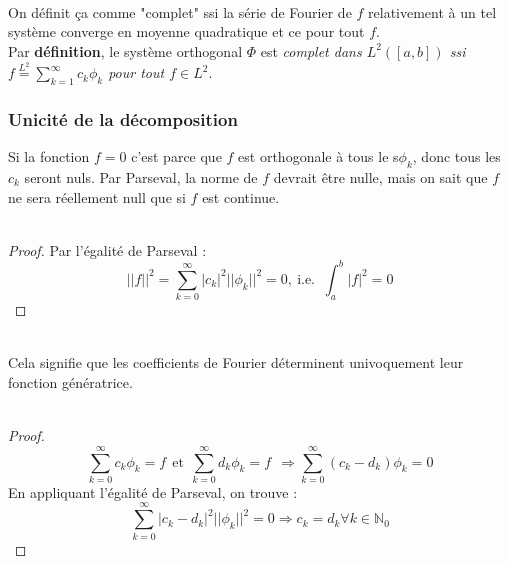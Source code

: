 \documentclass[11pt, a4paper, openany]{book}
\newcommand{\serie}{\sum_{k=1}^\infty}
\newcommand{\series}{\sum_{k=0}^\infty}
\begin{document}
		\theor{Si $f_{L^2} = \serie c_k\phi_k$ alors $\serie |c_k|^2||\phi_k||^2 \leq ||f||^2$}\ \\
									
		On définit ça comme "complet" ssi la série de Fourier de $f$ relativement à un tel système converge en moyenne quadratique et ce pour tout $f$.\\
									
		Par \textbf{définition}, le système orthogonal $\Phi$ est \textit{complet dans $L^2([a,b])$ ssi $f \overset{L^2}{=}\serie c_k\phi_k$ pour tout $f \in L^2$}.
									
									
		\subsubsection*{Unicité de la décomposition}
		Si la fonction $f = 0$ c'est parce que $f$ est orthogonale à tous le s$\phi_k$, donc tous les $c_k$ seront nuls. Par Parseval, la norme de $f$ devrait être nulle, mais on sait que $f$ ne sera réellement null que si $f$ est continue.\\
									
		\ \\
									
		\begin{proof}
			Par l'égalité de Parseval :
			\begin{equation}
				||f||^2 = \series |c_k|^2||\phi_k||^2  = 0,\ \text{i.e. }\ \int_a^b |f|^2 = 0
			\end{equation}
		\end{proof}
									
		\ \\
		Cela signifie que les coefficients de Fourier déterminent univoquement leur fonction génératrice.\\
									
									
		\ \\
		\begin{proof}
			\begin{equation}
				\series c_k\phi_k = f\ \ \text{et}\ \ \series d_k\phi_k = f\ \ \Rightarrow \series (c_k-d_k)\phi_k = 0
			\end{equation}
			En appliquant l'égalité de Parseval, on trouve : 
			\begin{equation}
				\series |c_k-d_k|^2||\phi_k||^2 = 0 \Rightarrow c_k = d_k \forall k \in \mathbb{N}_0
			\end{equation}
		\end{proof}
		\setcounter{subsection}{3}
\end{document}
